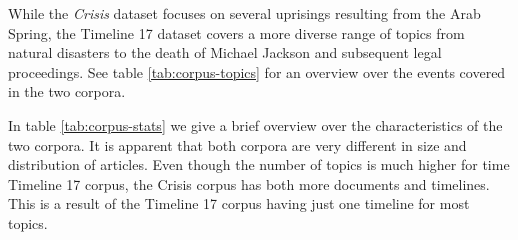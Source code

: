 \documentclass[a4paper,BCOR=10mm]{report}
\numberwithin{lemma}{chapter}
\numberwithin{definition}{chapter}
\begin{document}
While the \textit{Crisis} dataset focuses on several uprisings resulting from the Arab Spring, the Timeline 17 dataset covers a more diverse range of topics from natural disasters to the death of Michael Jackson and subsequent legal proceedings. See table \ref{tab:corpus-topics} for an overview over the events covered in the two corpora.

In table \ref{tab:corpus-stats} we give a brief overview over the characteristics of the two corpora. It is apparent that both corpora are very different in size and distribution of articles. Even though the number of topics is much higher for time Timeline 17 corpus, the Crisis corpus has both more documents and timelines. This is a result of the Timeline 17 corpus having just one timeline for most topics.

\begin{table}
\begin{centering}

\end{centering}

\caption{Corpus Statistics for our evaluation corpora}
\label{tab:corpus-stats}
\end{table}

\begin{table}
\begin{centering}
\end{centering}

\caption{Topics of our evaluation corpora}
\label{tab:corpus-topics}
\end{table}
\end{document}
